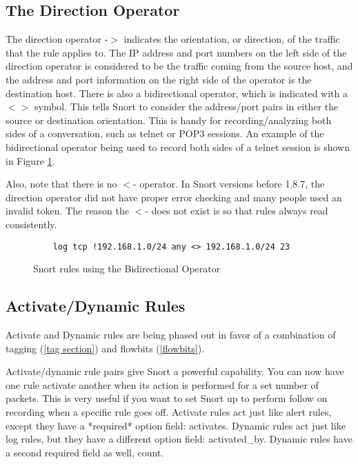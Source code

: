 \documentclass[english]{report}
\newenvironment{note}{
\samepage
    \vspace{10pt}{\textsf{
        {\hspace{7pt}\Huge{$\triangle$\hspace{-12.5pt}{\Large{$^!$}}}}\hspace{5pt}
        {\Large{NOTE}}
    }
    }
   \begin{center}
    \par\vspace{-17pt}

    \begin{lrbox}{\savepar}
    \begin{minipage}[r]{6in}
}
{
    \end{minipage}
    \end{lrbox}
    \fbox{
        \usebox{
            \savepar
	}
    }
    \par\vskip10pt
    \end{center}
}
\newenvironment{note}{
        \begin{rawhtml}
        <p><table border="1"><tr><td><b>
        Note:&nbsp;&nbsp;</b>
        \end{rawhtml}
}{
        \begin{rawhtml}
        </b></td></tr></table></p>
        \end{rawhtml}
}
\begin{document}
\subsection{The Direction Operator}

The direction operator -$>$ indicates the orientation, or direction, of the
traffic that the rule applies to. The IP address and port numbers on the left
side of the direction operator is considered to be the traffic coming from the
source host, and the address and port information on the right side of the
operator is the destination host. There is also a bidirectional operator, which
is indicated with a $<>$ symbol. This tells Snort to consider the address/port
pairs in either the source or destination orientation. This is handy for
recording/analyzing both sides of a conversation, such as telnet or POP3
sessions. An example of the bidirectional operator being used to record both
sides of a telnet session is shown in Figure \ref{bidirectional operator}.

Also, note that there is no $<$- operator. In Snort versions before 1.8.7, the
direction operator did not have proper error checking and many people used an
invalid token. The reason the $<$- does not exist is so that rules always read
consistently.

\begin{figure}
\begin{verbatim}
    log tcp !192.168.1.0/24 any <> 192.168.1.0/24 23
\end{verbatim}

\caption{\label{bidirectional operator}Snort rules using the Bidirectional
Operator}
\end{figure}

\subsection{Activate/Dynamic Rules}
\label{dynamic rules}

\begin{note}

Activate and Dynamic rules are being phased out in favor of a combination of
tagging (\ref{tag section}) and flowbits (\ref{flowbits}). 

\end{note}

Activate/dynamic rule pairs give Snort a powerful capability. You can now have
one rule activate another when its action is performed for a set number of
packets. This is very useful if you want to set Snort up to perform follow on
recording when a specific rule goes off. Activate rules act just like alert
rules, except they have a {*}required{*} option field: activates.  Dynamic
rules act just like log rules, but they have a different option field:
activated\_by. Dynamic rules have a second required field as well, count. 
\end{document}
